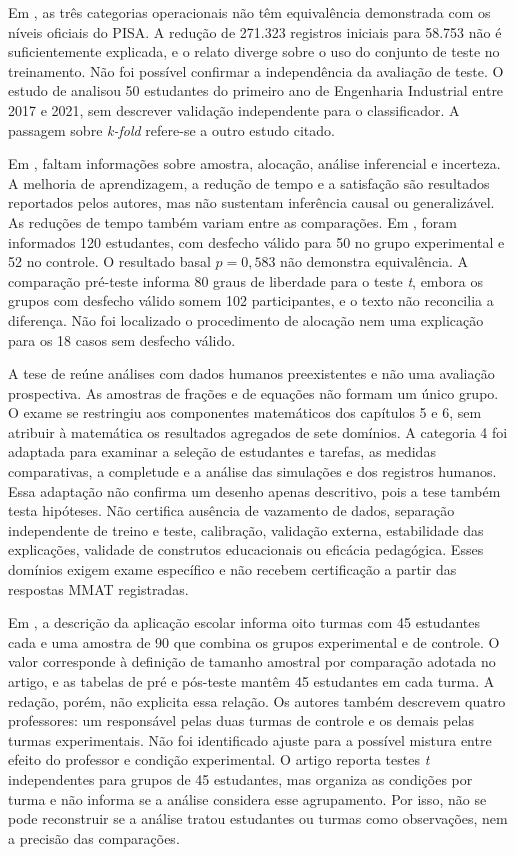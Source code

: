 Em , as três categorias operacionais não têm equivalência demonstrada com os níveis oficiais do PISA. A redução de 271.323 registros iniciais para 58.753 não é suficientemente explicada, e o relato diverge sobre o uso do conjunto de teste no treinamento. Não foi possível confirmar a independência da avaliação de teste. O estudo de  analisou 50 estudantes do primeiro ano de Engenharia Industrial entre 2017 e 2021, sem descrever validação independente para o classificador. A passagem sobre \textit{k-fold} refere-se a outro estudo citado.

Em , faltam informações sobre amostra, alocação, análise inferencial e incerteza. A melhoria de aprendizagem, a redução de tempo e a satisfação são resultados reportados pelos autores, mas não sustentam inferência causal ou generalizável. As reduções de tempo também variam entre as comparações. Em , foram informados 120 estudantes, com desfecho válido para 50 no grupo experimental e 52 no controle. O resultado basal $p=0{,}583$ não demonstra equivalência. A comparação pré-teste informa 80 graus de liberdade para o teste \textit{t}, embora os grupos com desfecho válido somem 102 participantes, e o texto não reconcilia a diferença. Não foi localizado o procedimento de alocação nem uma explicação para os 18 casos sem desfecho válido.

A tese de  reúne análises com dados humanos preexistentes e não uma avaliação prospectiva. As amostras de frações e de equações não formam um único grupo. O exame se restringiu aos componentes matemáticos dos capítulos 5 e 6, sem atribuir à matemática os resultados agregados de sete domínios. A categoria 4 foi adaptada para examinar a seleção de estudantes e tarefas, as medidas comparativas, a completude e a análise das simulações e dos registros humanos. Essa adaptação não confirma um desenho apenas descritivo, pois a tese também testa hipóteses. Não certifica ausência de vazamento de dados, separação independente de treino e teste, calibração, validação externa, estabilidade das explicações, validade de construtos educacionais ou eficácia pedagógica. Esses domínios exigem exame específico e não recebem certificação a partir das respostas MMAT registradas.

Em , a descrição da aplicação escolar informa oito turmas com 45 estudantes cada e uma amostra de 90 que combina os grupos experimental e de controle. O valor corresponde à definição de tamanho amostral por comparação adotada no artigo, e as tabelas de pré e pós-teste mantêm 45 estudantes em cada turma. A redação, porém, não explicita essa relação. Os autores também descrevem quatro professores: um responsável pelas duas turmas de controle e os demais pelas turmas experimentais. Não foi identificado ajuste para a possível mistura entre efeito do professor e condição experimental. O artigo reporta testes \textit{t} independentes para grupos de 45 estudantes, mas organiza as condições por turma e não informa se a análise considera esse agrupamento. Por isso, não se pode reconstruir se a análise tratou estudantes ou turmas como observações, nem a precisão das comparações.

